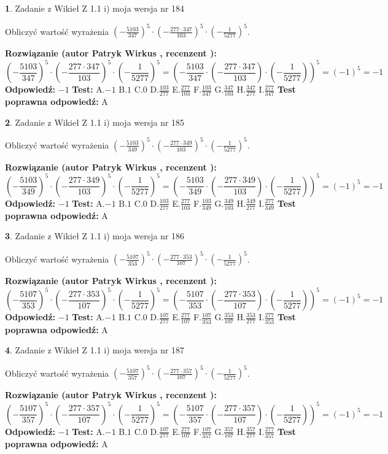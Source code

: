 \documentclass[12pt, a4paper]{article}
\theoremstyle{definition} %
\newtheorem{zad}{}
\newcommand{\zadStart}[1]{\begin{zad}#1\newline}
\newcommand{\zadStop}{\end{zad}}
\newcommand{\rozwStart}[2]{\noindent \textbf{Rozwiązanie (autor #1 , recenzent #2): }\newline}
\newcommand{\rozwStop}{\newline}
\newcommand{\odpStart}{\noindent \textbf{Odpowiedź:}\newline}
\newcommand{\odpStop}{\newline}
\newcommand{\testStart}{\noindent \textbf{Test:}\newline}
\newcommand{\testStop}{\newline}
\newcommand{\kluczStart}{\noindent \textbf{Test poprawna odpowiedź:}\newline}
\newcommand{\kluczStop}{\newline}
\begin{document}
\zadStart{Zadanie z Wikieł Z 1.1 i) moja wersja nr 184}

Obliczyć wartość wyrażenia $(-\frac{5103}{347})^{5} \cdot (-\frac{277 \cdot 347}{103})^{5} \cdot (-\frac{1}{5277})^{5}$.
\zadStop
\rozwStart{Patryk Wirkus}{}
$$(-\frac{5103}{347})^{5} \cdot (-\frac{277 \cdot 347}{103})^{5} \cdot (-\frac{1}{5277})^{5} = (-\frac{5103}{347} \cdot (-\frac{277 \cdot 347}{103}) \cdot (-\frac{1}{5277}))^{5} = (-1)^{5} = -1$$
\rozwStop
\odpStart
$-1$
\odpStop
\testStart
A.$-1$ B.$1$ C.$0$ D.$\frac{103}{277}$ E.$\frac{277}{103}$
F.$\frac{103}{347}$ G.$\frac{347}{103}$
H.$\frac{347}{277}$
I.$\frac{277}{347}$
\testStop
\kluczStart
A
\kluczStop



\zadStart{Zadanie z Wikieł Z 1.1 i) moja wersja nr 185}

Obliczyć wartość wyrażenia $(-\frac{5103}{349})^{5} \cdot (-\frac{277 \cdot 349}{103})^{5} \cdot (-\frac{1}{5277})^{5}$.
\zadStop
\rozwStart{Patryk Wirkus}{}
$$(-\frac{5103}{349})^{5} \cdot (-\frac{277 \cdot 349}{103})^{5} \cdot (-\frac{1}{5277})^{5} = (-\frac{5103}{349} \cdot (-\frac{277 \cdot 349}{103}) \cdot (-\frac{1}{5277}))^{5} = (-1)^{5} = -1$$
\rozwStop
\odpStart
$-1$
\odpStop
\testStart
A.$-1$ B.$1$ C.$0$ D.$\frac{103}{277}$ E.$\frac{277}{103}$
F.$\frac{103}{349}$ G.$\frac{349}{103}$
H.$\frac{349}{277}$
I.$\frac{277}{349}$
\testStop
\kluczStart
A
\kluczStop



\zadStart{Zadanie z Wikieł Z 1.1 i) moja wersja nr 186}

Obliczyć wartość wyrażenia $(-\frac{5107}{353})^{5} \cdot (-\frac{277 \cdot 353}{107})^{5} \cdot (-\frac{1}{5277})^{5}$.
\zadStop
\rozwStart{Patryk Wirkus}{}
$$(-\frac{5107}{353})^{5} \cdot (-\frac{277 \cdot 353}{107})^{5} \cdot (-\frac{1}{5277})^{5} = (-\frac{5107}{353} \cdot (-\frac{277 \cdot 353}{107}) \cdot (-\frac{1}{5277}))^{5} = (-1)^{5} = -1$$
\rozwStop
\odpStart
$-1$
\odpStop
\testStart
A.$-1$ B.$1$ C.$0$ D.$\frac{107}{277}$ E.$\frac{277}{107}$
F.$\frac{107}{353}$ G.$\frac{353}{107}$
H.$\frac{353}{277}$
I.$\frac{277}{353}$
\testStop
\kluczStart
A
\kluczStop



\zadStart{Zadanie z Wikieł Z 1.1 i) moja wersja nr 187}

Obliczyć wartość wyrażenia $(-\frac{5107}{357})^{5} \cdot (-\frac{277 \cdot 357}{107})^{5} \cdot (-\frac{1}{5277})^{5}$.
\zadStop
\rozwStart{Patryk Wirkus}{}
$$(-\frac{5107}{357})^{5} \cdot (-\frac{277 \cdot 357}{107})^{5} \cdot (-\frac{1}{5277})^{5} = (-\frac{5107}{357} \cdot (-\frac{277 \cdot 357}{107}) \cdot (-\frac{1}{5277}))^{5} = (-1)^{5} = -1$$
\rozwStop
\odpStart
$-1$
\odpStop
\testStart
A.$-1$ B.$1$ C.$0$ D.$\frac{107}{277}$ E.$\frac{277}{107}$
F.$\frac{107}{357}$ G.$\frac{357}{107}$
H.$\frac{357}{277}$
I.$\frac{277}{357}$
\testStop
\kluczStart
A
\kluczStop
\end{document}
